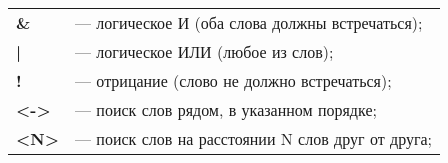 \begin{frame}
  \centering
  \begin{tabular}{@{} l l}
    {\bfseries\textcolor{RNDSorange} \&} & — логическое И (оба слова должны встречаться); \\
    {\bfseries\textcolor{RNDSorange} |} & — логическое ИЛИ (любое из слов); \\
    {\bfseries\textcolor{RNDSorange} !} & — отрицание (слово не должно встречаться); \\
    {\bfseries\textcolor{RNDSorange} {\textless -\textgreater}} & — поиск слов рядом, в указанном порядке; \\
    {\bfseries\textcolor{RNDSorange} {\textless N\textgreater}} & — поиск слов на расстоянии N слов друг от друга;
  \end{tabular}
\end{frame}
